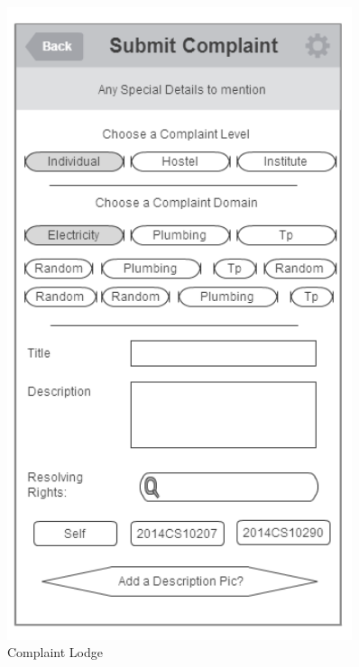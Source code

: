 \documentclass[12pt]{article}
\begin{document}
\begin{figure}[!ht]
\begin{minipage}{.32\textwidth}
        \includegraphics[width=0.9\textwidth]{./appMockUp/submitComplainScreen}
        \caption{Complaint Lodge}
        \label{fig:submitComplainScreen}
      \end{minipage}
      \begin{minipage}{.32\textwidth}
        \centering

\end{minipage}
\end{figure}
\end{document}

